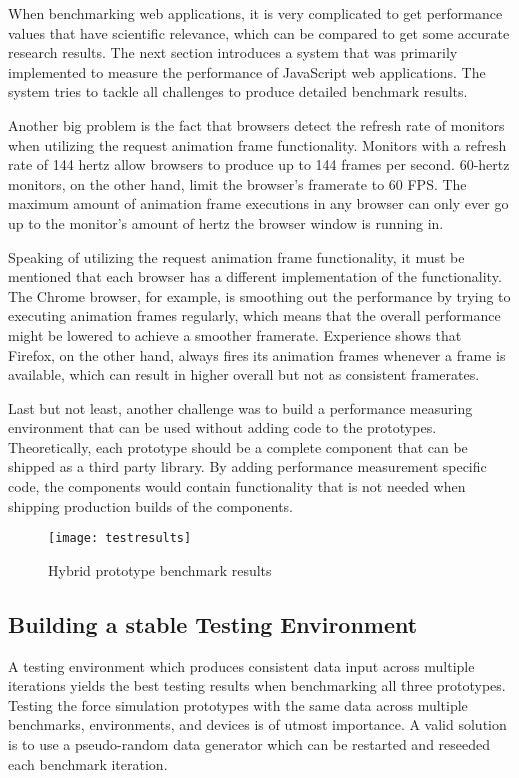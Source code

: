 When benchmarking web applications, it is very complicated to get performance values that have scientific relevance, which can be compared to get some accurate research results. The next section introduces a system that was primarily implemented to measure the performance of JavaScript web applications. The system tries to tackle all challenges to produce detailed benchmark results.

Another big problem is the fact that browsers detect the refresh rate of monitors when utilizing the request animation frame functionality. Monitors with a refresh rate of 144 hertz allow browsers to produce up to 144 frames per second. 60-hertz monitors, on the other hand, limit the browser's framerate to 60 FPS. The maximum amount of animation frame executions in any browser can only ever go up to the monitor's amount of hertz the browser window is running in. 

Speaking of utilizing the request animation frame functionality, it must be mentioned that each browser has a different implementation of the functionality. The Chrome browser, for example, is smoothing out the performance by trying to executing animation frames regularly, which means that the overall performance might be lowered to achieve a smoother framerate. Experience shows that Firefox, on the other hand, always fires its animation frames whenever a frame is available, which can result in higher overall but not as consistent framerates.

Last but not least, another challenge was to build a performance measuring environment that can be used without adding code to the prototypes. Theoretically, each prototype should be a complete component that can be shipped as a third party library. By adding performance measurement specific code, the components would contain functionality that is not needed when shipping production builds of the components.

\begin{figure}
  \centering
  \texttt{[image: testresults]}
  \caption{Hybrid prototype benchmark results}
  \label{fig:reactD3benchResult}
\end{figure}

\subsection{Building a stable Testing Environment}
\label{sub:perfImplDetails}

A testing environment which produces consistent data input across multiple iterations yields the best testing results when benchmarking all three prototypes. Testing the force simulation prototypes with the same data across multiple benchmarks, environments, and devices is of utmost importance. A valid solution is to use a pseudo-random data generator which can be restarted and reseeded each benchmark iteration.

